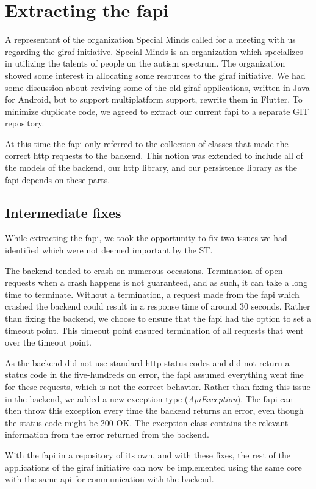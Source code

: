 \section{Extracting the \gls{fapi}}

A representant of the organization Special Minds called for a meeting with us regarding the \gls{giraf} initiative. Special Minds is an organization which specializes in utilizing the talents of people on the autism spectrum. The organization showed some interest in allocating some resources to the \gls{giraf} initiative. We had some discussion about reviving some of the old \gls{giraf} applications, written in Java for Android, but to support multiplatform support, rewrite them in Flutter. To minimize duplicate code, we agreed to extract our current \gls{fapi} to a separate GIT repository.

At this time the \gls{fapi} only referred to the collection of classes that made the correct \gls{http} requests to the backend. This notion was extended to include all of the models of the backend, our \gls{http} library, and our persistence library as the \gls{fapi} depends on these parts.

\subsection{Intermediate fixes}
While extracting the \gls{fapi}, we took the opportunity to fix two issues we had identified which were not deemed important by the \gls{ST}.

The backend tended to crash on numerous occasions. Termination of open requests when a crash happens is not guaranteed, and as such, it can take a long time to terminate. Without a termination, a request made from the \gls{fapi} which crashed the backend could result in a response time of around 30 seconds. Rather than fixing the backend, we choose to ensure that the \gls{fapi} had the option to set a timeout point. This timeout point ensured termination of all requests that went over the timeout point.

As the backend did not use standard \gls{http} status codes and did not return a status code in the five-hundreds on error, the \gls{fapi} assumed everything went fine for these requests, which is not the correct behavior. Rather than fixing this issue in the backend, we added a new exception type (\textit{ApiException}). The \gls{fapi} can then throw this exception every time the backend returns an error, even though the status code might be 200 OK. The exception class contains the relevant information from the error returned from the backend.

With the \gls{fapi} in a repository of its own, and with these fixes, the rest of the applications of the \gls{giraf} initiative can now be implemented using the same core with the same \gls{api} for communication with the backend.
